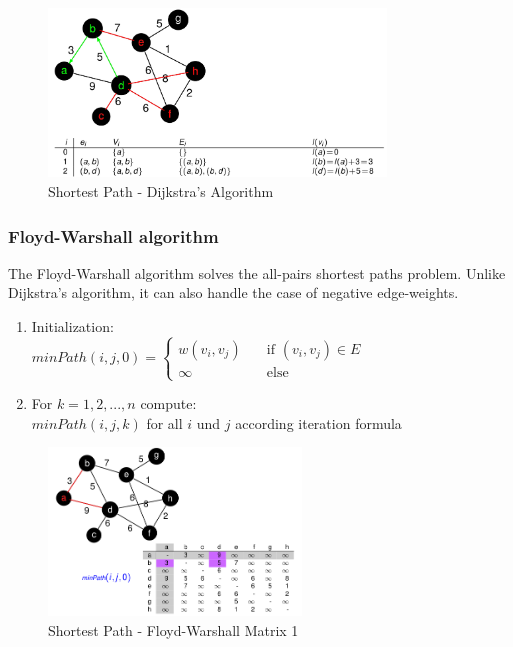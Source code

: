 \begin{figure}[H]
\centering
\includegraphics[width=0.8\textwidth]{figures/dijkstra.png}
\caption{Shortest Path - Dijkstra's Algorithm}
\end{figure}

\clearpage
\subsubsection{Floyd-Warshall algorithm}

The Floyd-Warshall algorithm solves the all-pairs shortest paths
problem. Unlike Dijkstra’s algorithm, it can also handle the case of
negative edge-weights.

\begin{enumerate}
    \item Initialization: \\
    $minPath(i, j, 0) =
  \begin{cases}
    w(v_i, v_j)       & \quad \text{if } (v_i, v_j) \in E\\
     \infty   & \quad \text{else}
  \end{cases}$
  \item For $k = 1,2,..., n$ compute: \\
  $minPath (i, j, k )$ for all $i$ und $j$ according iteration formula
\end{enumerate}

\begin{figure}[H]
\centering
\includegraphics[width=0.6\textwidth]{figures/floyd1.png}
\caption{Shortest Path - Floyd-Warshall Matrix 1}
\end{figure}

